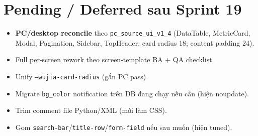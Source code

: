 \section{Pending / Deferred sau Sprint 19}

\begin{itemize}
  \item \textbf{PC/desktop reconcile} theo \texttt{pc\_source\_ui\_v1\_4} (DataTable,
        MetricCard, Modal, Pagination, Sidebar, TopHeader; card radius 18; content padding 24).
  \item Full per-screen rework theo screen-template BA + QA checklist.
  \item Unify \texttt{--wujia-card-radius} (gắn PC pass).
  \item Migrate \texttt{bg\_color} notification trên DB đang chạy nếu cần (hiện noupdate).
  \item Trim comment file Python/XML (mới làm CSS).
  \item Gom \texttt{search-bar}/\texttt{title-row}/\texttt{form-field} nếu sau muốn (hiện tuned).
\end{itemize}
